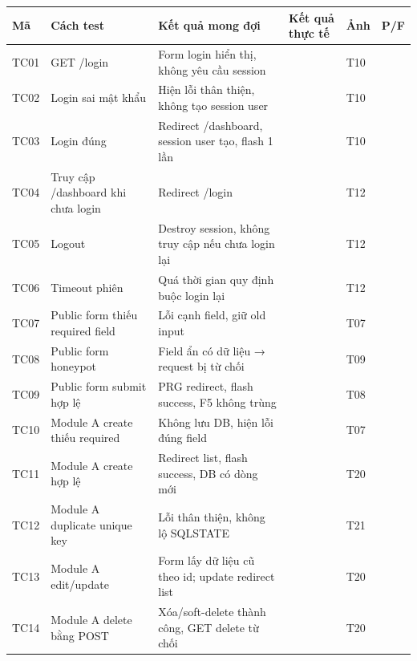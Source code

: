 \begin{longtable}{|p{0.8cm}|p{2cm}|p{2cm}|p{2cm}|p{1.2cm}|p{0.5cm}|}
\hline
\textbf{Mã} & \textbf{Cách test} & \textbf{Kết quả mong đợi} & \textbf{Kết quả thực tế} & \textbf{Ảnh} & \textbf{P/F} \\
\hline
\endhead

TC01 & GET /login & Form login hiển thị, không yêu cầu session &  & T10 &  \\
\hline

TC02 & Login sai mật khẩu & Hiện lỗi thân thiện, không tạo session user &  & T10 &  \\
\hline

TC03 & Login đúng & Redirect /dashboard, session user tạo, flash 1 lần &  & T10 &  \\
\hline

TC04 & Truy cập /dashboard khi chưa login & Redirect /login &  & T12 &  \\
\hline

TC05 & Logout & Destroy session, không truy cập nếu chưa login lại &  & T12 &  \\
\hline

TC06 & Timeout phiên & Quá thời gian quy định buộc login lại &  & T12 &  \\
\hline

TC07 & Public form thiếu required field & Lỗi cạnh field, giữ old input &  & T07 &  \\
\hline

TC08 & Public form honeypot & Field ẩn có dữ liệu → request bị từ chối &  & T09 &  \\
\hline

TC09 & Public form submit hợp lệ & PRG redirect, flash success, F5 không trùng &  & T08 &  \\
\hline

TC10 & Module A create thiếu required & Không lưu DB, hiện lỗi đúng field &  & T07 &  \\
\hline

TC11 & Module A create hợp lệ & Redirect list, flash success, DB có dòng mới &  & T20 &  \\
\hline

TC12 & Module A duplicate unique key & Lỗi thân thiện, không lộ SQLSTATE &  & T21 &  \\
\hline

TC13 & Module A edit/update & Form lấy dữ liệu cũ theo id; update redirect list &  & T20 &  \\
\hline

TC14 & Module A delete bằng POST & Xóa/soft-delete thành công, GET delete từ chối &  & T20 &  \\
\hline


\end{longtable}
